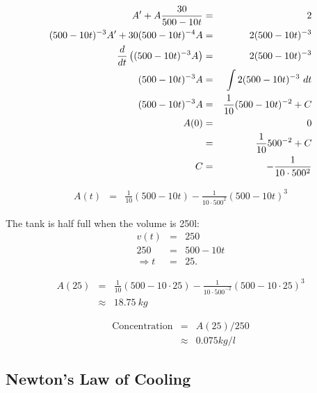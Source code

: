 \begin{frame}

  \begin{eqnarray*}
    A' + A \frac{30}{500-10t} & = & 2 \\
    (500-10t)^{-3} A' + 30(500-10t)^{-4} A & = & 2 (500-10t)^{-3} \\
    \frac{d}{dt} \left( (500-10t)^{-3} A \right) & = & 2 (500-10t)^{-3} \\
    (500-10t)^{-3} A  & = & \int 2 (500-10t)^{-3} ~ dt  \\
    (500-10t)^{-3} A  & = & \frac{1}{10} (500-10t)^{-2} + C  \\
    A(0) & = & 0 \\
    & = & \frac{1}{10} 500^{-2} + C \\
    C & = & -\frac{1}{10\cdot500^{2}}
  \end{eqnarray*}

  \begin{eqnarray*}
    A(t) & = & \frac{1}{10} (500-10t) - \frac{1}{10\cdot500^{2}} (500-10t)^3
  \end{eqnarray*}

\end{frame}


\begin{frame}

  The tank is half full when the volume is 250l:
  \begin{eqnarray*}
    v(t) & = & 250 \\
    250 & = & 500-10t \\
    \Rightarrow t & = & 25.
  \end{eqnarray*}

  \begin{eqnarray*}
    A(25) & = & \frac{1}{10} (500-10\cdot 25) - \frac{1}{10\cdot500^{-2}} (500-10\cdot 25)^3 \\
    & \approx & 18.75 ~ kg
  \end{eqnarray*}

  \begin{eqnarray*}
    \mathrm{Concentration} & = & A(25)/250 \\
    & \approx & 0.075 kg/l
  \end{eqnarray*}

\end{frame}

\subsection{Newton's Law of Cooling}

